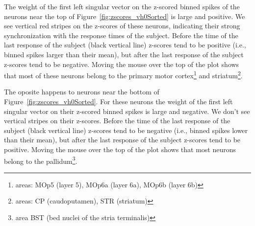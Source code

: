 \documentclass[12pt]{article}
\begin{document}
The weight of the first left singular vector on the z-scored binned spikes of
the neurons near the top of Figure~\ref{fig:zscores_vh0Sorted} is large and
positive. We see
vertical red stripes on the z-scores of these neurons, indicating their strong
synchronization with the response times of the subject.
%
Before the time of the last response of the subject (black vertical line)
z-scores tend to be positive (i.e., binned spikes larger than their mean),
but after the last response of the subject z-scores tend to be negative.
%
Moving the mouse over the top of the plot shows that most of these neurons
belong to the
primary motor cortex\footnote{areas: MOp5 (layer 5), MOp6a (layer 6a), MOp6b
(layer 6b)} and striatum\footnote{areas: CP (caudoputamen), STR (striatum)}.

The oposite happens to neurons near the bottom of
Figure~\ref{fig:zscores_vh0Sorted}. For these neurons the weight of the first
left singular vector on their z-scored binned spikes is large and negative. We
don't see vertical stripes on their z-scores. Before the time of the last
response of the subject (black vertical line) z-scores tend to be negative
(i.e., binned spikes lower than their mean), but after the last response of the
subject z-scores tend to be positive.
%
Moving the mouse over the top of the plot shows that most neurons belong to the
pallidum\footnote{area BST (bed nuclei of the stria terminalis)}.

\end{document}
